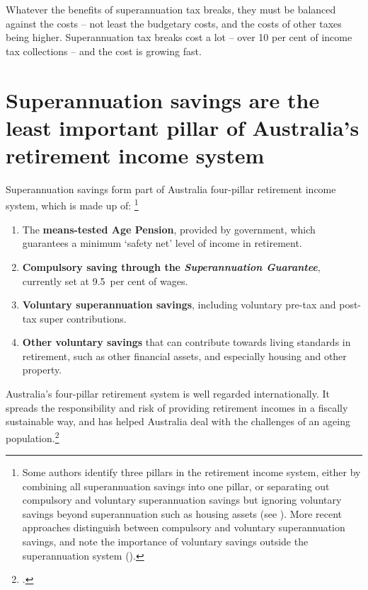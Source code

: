 Whatever the benefits of superannuation tax breaks, they must be balanced against the costs – not least the budgetary costs, and the costs of other taxes being higher. Superannuation tax breaks cost a lot – over 10 per cent of income tax collections – and the cost is growing fast.

\section{Superannuation savings are the least important pillar of Australia's retirement income system}\label{sec:SUPER-Super-savings-are-least-important-pillar}\label{sec:SUPER-2-1}
Superannuation savings form part of Australia four-pillar retirement income system, which is made up of:%
\footnote{%
Some authors identify three pillars in the retirement income system, either by combining all superannuation savings into one pillar, or separating out compulsory and voluntary superannuation savings but ignoring voluntary savings beyond superannuation such as housing assets (see \textcite[][9]{Treasury2009aftsRetirementIncomeStrategicIssues}). More recent approaches distinguish between compulsory and voluntary superannuation savings, and note the importance of voluntary savings outside the superannuation system (\textcite[][17]{Derby2015}). 
} 
\begin{enumerate}
\item The \textbf{means-tested Age Pension}, provided by government, which guarantees a minimum `safety net' level of income in retirement.
\item \textbf{Compulsory saving through the \emph{Superannuation Guarantee}}, currently set at 9.5~per cent of wages.
\item \textbf{Voluntary superannuation savings}, including voluntary pre-tax and post-tax super contributions.
\item \textbf{Other voluntary savings} that can contribute towards living standards in retirement, such as other financial assets, and especially housing and other property.
\end{enumerate}

Australia’s four-pillar retirement system is well regarded internationally. It spreads the responsibility and risk of providing retirement incomes in a fiscally sustainable way, and has helped Australia deal with the challenges of an ageing population.\footcite{Mercer2015} 

